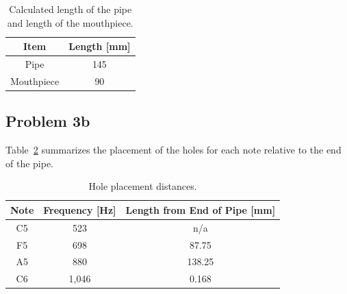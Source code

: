 {\renewcommand{\arraystretch}{1.5}
\begin{table}[h!]
    \begin{center}
        \small
        \begin{tabular}{ | c | c | }
            \hline
            \textbf{Item}  &  \textbf{Length [mm]}  \\
            \hline
                Pipe  &  145  \\
                \hline
                \rowcolor{Gray}
                Mouthpiece  &  90  \\
            \hline
        \end{tabular}
    \end{center}
    \caption{Calculated length of the pipe and length of the mouthpiece.}
    \label{table:mouthpieceAndPip}
\end{table}


\vspace{-0.25cm}
\subsection*{Problem 3b}

Table~\ref{table:holePlacementSummary} summarizes the placement of the holes for each note relative to the end of the pipe.

\setlength{\abovecaptionskip}{0pt}
\vspace{0.1cm}
{\renewcommand{\arraystretch}{1.5}
\begin{table}[h!]
    \begin{center}
        \small
        \begin{tabular}{ | c | c | c | }
            \hline
            \textbf{Note}  &  \textbf{Frequency [Hz]}  &  \textbf{Length from End of Pipe [mm]}  \\
            \hline
                C5  &  523      &  n/a  \\
                \rowcolor{Gray}
                F5  &  698      &  87.75  \\
                A5  &  880      &  138.25  \\
                \rowcolor{Gray}
                C6  &  1,046    &  0.168  \\
            \hline
        \end{tabular}
    \end{center}
    \caption{Hole placement distances.}
    \label{table:holePlacementSummary}
\end{table}


}}
